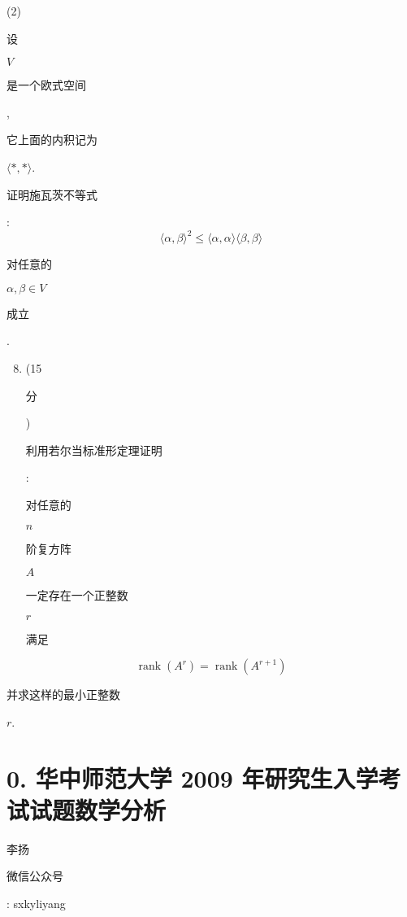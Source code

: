 \documentclass[10pt]{article}
\begin{document}
(2) \begin{CJK}{UTF8}{mj}设\end{CJK} $V$ \begin{CJK}{UTF8}{mj}是一个欧式空间\end{CJK}, \begin{CJK}{UTF8}{mj}它上面的内积记为\end{CJK} $\langle *, *\rangle$. \begin{CJK}{UTF8}{mj}证明施瓦茨不等式\end{CJK}:
$$
\langle\alpha, \beta\rangle^{2} \leqslant\langle\alpha, \alpha\rangle\langle\beta, \beta\rangle
$$
\begin{CJK}{UTF8}{mj}对任意的\end{CJK} $\alpha, \beta \in V$ \begin{CJK}{UTF8}{mj}成立\end{CJK}.

\begin{enumerate}
  \setcounter{enumi}{7}
  \item (15 \begin{CJK}{UTF8}{mj}分\end{CJK}) \begin{CJK}{UTF8}{mj}利用若尔当标准形定理证明\end{CJK}: \begin{CJK}{UTF8}{mj}对任意的\end{CJK} $n$ \begin{CJK}{UTF8}{mj}阶复方阵\end{CJK} $A$ \begin{CJK}{UTF8}{mj}一定存在一个正整数\end{CJK} $r$ \begin{CJK}{UTF8}{mj}满足\end{CJK}
\end{enumerate}
$$
\operatorname{rank}\left(A^{r}\right)=\operatorname{rank}\left(A^{r+1}\right)
$$
\begin{CJK}{UTF8}{mj}并求这样的最小正整数\end{CJK} $r$.

\section{0. 华中师范大学 2009 年研究生入学考试试题数学分析}
\begin{CJK}{UTF8}{mj}李扬\end{CJK}

\begin{CJK}{UTF8}{mj}微信公众号\end{CJK}: sxkyliyang
\end{document}
